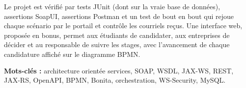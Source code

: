 Le projet est vérifié par \nbJunit{} tests JUnit (dont \nbJunitIT{} sur la vraie base de données), \nbSoapUI{} assertions SoapUI, \nbPostman{} assertions Postman et un test de bout en bout qui rejoue chaque scénario par le portail et contrôle les courriels reçus. Une interface web, proposée en bonus, permet aux étudiants de candidater, aux entreprises de décider et au responsable de suivre les stages, avec l'avancement de chaque candidature affiché sur le diagramme BPMN.

\bigskip
\textbf{Mots-clés :} architecture orientée services, SOAP, WSDL, JAX-WS, REST, JAX-RS, OpenAPI, BPMN, Bonita, orchestration, WS-Security, MySQL.
